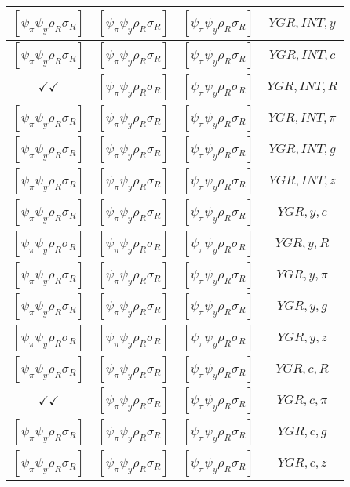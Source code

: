 \documentclass[a4paper,10pt]{article}
\begin{document}
\begin{longtable}{|c|c|c|c|}
\hline
$[\psi_\pi \psi_y \rho_R \sigma_R ]$ & $[\psi_\pi \psi_y \rho_R \sigma_R ]$ & $[\psi_\pi \psi_y \rho_R \sigma_R ]$ & ${YGR},{INT},{y}$ \\
\hline
$[\psi_\pi \psi_y \rho_R \sigma_R ]$ & $[\psi_\pi \psi_y \rho_R \sigma_R ]$ & $[\psi_\pi \psi_y \rho_R \sigma_R ]$ & ${YGR},{INT},{c}$ \\
\hline
$\checkmark\checkmark$ & $[\psi_\pi \psi_y \rho_R \sigma_R ]$ & $[\psi_\pi \psi_y \rho_R \sigma_R ]$ & ${YGR},{INT},{R}$ \\
\hline
$[\psi_\pi \psi_y \rho_R \sigma_R ]$ & $[\psi_\pi \psi_y \rho_R \sigma_R ]$ & $[\psi_\pi \psi_y \rho_R \sigma_R ]$ & ${YGR},{INT},{\pi}$ \\
\hline
$[\psi_\pi \psi_y \rho_R \sigma_R ]$ & $[\psi_\pi \psi_y \rho_R \sigma_R ]$ & $[\psi_\pi \psi_y \rho_R \sigma_R ]$ & ${YGR},{INT},{g}$ \\
\hline
$[\psi_\pi \psi_y \rho_R \sigma_R ]$ & $[\psi_\pi \psi_y \rho_R \sigma_R ]$ & $[\psi_\pi \psi_y \rho_R \sigma_R ]$ & ${YGR},{INT},{z}$ \\
\hline
$[\psi_\pi \psi_y \rho_R \sigma_R ]$ & $[\psi_\pi \psi_y \rho_R \sigma_R ]$ & $[\psi_\pi \psi_y \rho_R \sigma_R ]$ & ${YGR},{y},{c}$ \\
\hline
$[\psi_\pi \psi_y \rho_R \sigma_R ]$ & $[\psi_\pi \psi_y \rho_R \sigma_R ]$ & $[\psi_\pi \psi_y \rho_R \sigma_R ]$ & ${YGR},{y},{R}$ \\
\hline
$[\psi_\pi \psi_y \rho_R \sigma_R ]$ & $[\psi_\pi \psi_y \rho_R \sigma_R ]$ & $[\psi_\pi \psi_y \rho_R \sigma_R ]$ & ${YGR},{y},{\pi}$ \\
\hline
$[\psi_\pi \psi_y \rho_R \sigma_R ]$ & $[\psi_\pi \psi_y \rho_R \sigma_R ]$ & $[\psi_\pi \psi_y \rho_R \sigma_R ]$ & ${YGR},{y},{g}$ \\
\hline
$[\psi_\pi \psi_y \rho_R \sigma_R ]$ & $[\psi_\pi \psi_y \rho_R \sigma_R ]$ & $[\psi_\pi \psi_y \rho_R \sigma_R ]$ & ${YGR},{y},{z}$ \\
\hline
$[\psi_\pi \psi_y \rho_R \sigma_R ]$ & $[\psi_\pi \psi_y \rho_R \sigma_R ]$ & $[\psi_\pi \psi_y \rho_R \sigma_R ]$ & ${YGR},{c},{R}$ \\
\hline
$\checkmark\checkmark$ & $[\psi_\pi \psi_y \rho_R \sigma_R ]$ & $[\psi_\pi \psi_y \rho_R \sigma_R ]$ & ${YGR},{c},{\pi}$ \\
\hline
$[\psi_\pi \psi_y \rho_R \sigma_R ]$ & $[\psi_\pi \psi_y \rho_R \sigma_R ]$ & $[\psi_\pi \psi_y \rho_R \sigma_R ]$ & ${YGR},{c},{g}$ \\
\hline
$[\psi_\pi \psi_y \rho_R \sigma_R ]$ & $[\psi_\pi \psi_y \rho_R \sigma_R ]$ & $[\psi_\pi \psi_y \rho_R \sigma_R ]$ & ${YGR},{c},{z}$ \\

\end{longtable}
\end{document}

